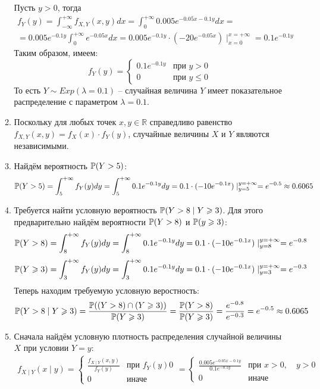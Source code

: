 \documentclass[12pt, a4paper]{article}\usepackage[]{graphicx}\usepackage[]{color}
\begin{document}
\begin{enumerate}
\begin{enumerate}
	Пусть $y > 0 $, тогда
	\begin{multline*}
	f_Y (y) = \int_{-\infty}^{+\infty} f_{X, Y} (x, y) dx  = \int_{0}^{+\infty} 0.005 e^{-0.05x-0.1y} dx = \\
	 = 0.005e^{-0.1y} \int_{0}^{+\infty} e^{-0.05x} dx = 0.005e^{-0.1y} \cdot \left(-20e^{-0.05x} \right) \mid_{x=0}^{x=+\infty} = 0.1 e^{-0.1y}
	\end{multline*}
	Таким образом, имеем:
	\[
	f_Y (y) = \begin{cases}
	0.1 e^{-0.1y} & \text{при } y>0 \\
	0 & \text{при } y \leq 0
	\end{cases}
	\]
	То есть $Y \sim Exp(\lambda=0.1)$ – случайная величина $Y$ имеет показательное распределение с параметром $\lambda = 0.1$.
	\item Поскольку для любых точек $x, y \in \mathbb{R}$ справедливо равенство $f_{X, Y} (x, y) = f_X (x) \cdot f_Y (y)$, случайные величины $X$ и $Y$ являются независимыми.
	\item Найдём вероятность $\P(Y>5)$:
	\[
	\P(Y>5) = \int_{5}^{+\infty} f_Y (y) dy = \int_{5}^{+\infty}  0.1 e^{-0.1y} dy = 0.1 \cdot (-10 e^{-0.1x}) \mid_{y=5}^{y=+\infty} = e^{-0.5} \approx0.6065
	\]
	\item Требуется найти условную вероятность $\P(Y>8 \mid Y \geq 3)$. Для этого предварительно найдём вероятности $\P(Y>8)$ и $\P(y \geq 3)$:
	\[
	\P(Y>8) = \int_{8}^{+\infty} f_Y (y) dy  = \int_{8}^{+\infty}  0.1 e^{-0.1y} dy = 0.1 \cdot (-10 e^{-0.1x}) \mid_{y=8}^{y=+\infty} = e^{-0.8}
	\]
	\[
	\P(Y \geq 3) =  \int_{3}^{+\infty} f_Y (y) dy   = \int_{3}^{+\infty}  0.1 e^{-0.1y} dy = 0.1 \cdot (-10 e^{-0.1x}) \mid_{y=3}^{y=+\infty} = e^{-0.3}
	\]
	Теперь находим требуемую условную веростность:
	\[
	\P(Y>8 \mid Y \geq 3) = \frac{\P((Y > 8) \cap
		(Y \geq 3))}{\P(Y \geq 3)} = \frac{\P(Y>8)}{\P(Y \geq 3) } = \frac{e^{-0.8}}{e^{-0.3}} = e^{-0.5} \approx0.6065
	\]
	\item Сначала найдём условную плотность распределения случайной величины $X$ при условии $Y=y$:
	\begin{multline*}
	f_{X \mid Y} (x \mid y) = \begin{cases}
	\frac{f_{X \mid Y} (x, y)}{f_Y (y)} & \text{при } f_Y (y) 0 \\
	0 & \text{иначе}
	\end{cases} =
	\begin{cases}
	\frac{0.005e^{-0.05x-0.1y}}{0.1e^{-0.1y}} & \text{при } x>0, \quad y>0 \\
	0 & \text{иначе}

\end{cases}
\end{multline*}
\end{enumerate}
\end{enumerate}
\end{document}
